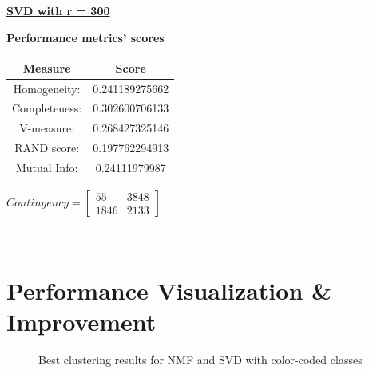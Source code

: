 \documentclass{report}
\begin{document}
\underline{\textbf{SVD with r = 300}} 

\begin{center}
	\textbf{Performance metrics' scores} \\ \vspace{10pt}
	\begin{tabular}{*{2}{c}}
		\toprule
		\textbf{Measure} & \textbf{Score} \\		
		\midrule
		Homogeneity: 		& 0.241189275662 \\
		\midrule
		Completeness: 		& 0.302600706133 \\
		\midrule
		V-measure: 			& 0.268427325146 \\
		\midrule
		RAND score: 		& 0.197762294913 \\ 
		\midrule
		Mutual Info: 		& 0.24111979987 \\
		\bottomrule
	\end{tabular}
	\qquad
	$Contingency = \left[\begin{array}{*{2}{c}}
		55 		& 3848 \\
		1846 	& 2133 
		\end{array}\right]
		$
\end{center}
\\ \vspace{20pt}



\section*{Performance Visualization \& Improvement}

\begin{figure}%
\centering
{}%
\qquad
{}%
\vspace*{-3mm}
\caption{Best clustering results for NMF and SVD with color-coded classes}
\end{figure}
\end{document}
